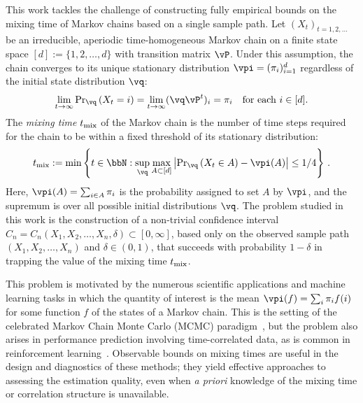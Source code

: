 

This work
tackles the challenge of constructing
fully empirical bounds on the
mixing time of Markov chains based on a single sample path.
Let $(X_t)_{t=1,2,\dotsc}$ be an irreducible, aperiodic
time-homogeneous Markov chain on a finite state space $[d] :=
\{1,2,\dotsc,d\}$ with transition matrix $\vP$.
Under this assumption, the chain converges to its unique stationary
distribution $\vpi =
(\pi_i)_{i=1}^d$ regardless of the initial state distribution $\vq$: 
\[
  \lim_{t\to\infty} {\Pr}_{\vq}\Parens{X_t = i}
  = \lim_{t\to\infty} (\vq \vP^t)_i = \pi_i
  \quad \text{for each $i \in [d]$} .
\]
The \emph{mixing time} $t_{\operatorname{mix}}$ of the Markov chain is the
number of time steps required
for the chain to
be within a fixed threshold of
its stationary
distribution:
\begin{align}
\label{eq:mixtimedef}
  \tmix
  :=
  \min\Braces{
    t \in \bbN :
    \sup_{\vq}
    \max_{A\subset [d]}
    \Abs{
      \textstyle\Pr_{\vq}\Parens{ X_t \in A } - \vpi(A)
    }
    \leq 1/4
  }\,.
\end{align}
Here, $\vpi(A) = \sum_{i\in A} \pi_i$ is the probability assigned to
set $A$ by $\vpi$, and the supremum is over all possible initial
distributions $\vq$.
The problem studied in this work is the construction of a non-trivial
confidence interval $C_n = C_n(X_1,X_2,\dotsc,X_n,\delta) \subset
[0,\infty]$, based only on the observed sample path
$(X_1,X_2,\dotsc,X_n)$ and $\delta \in (0,1)$, that
succeeds with probability $1-\delta$
in trapping
the value of the
mixing time $t_{\operatorname{mix}}$.

This problem is motivated by the numerous scientific applications and
machine learning tasks in which
the quantity of interest is
the
mean $\vpi(f) = \sum_i \pi_i f(i)$
for some function $f$ of the states of
a Markov chain.
  
This is the setting of the celebrated Markov Chain Monte Carlo (MCMC)
paradigm~\cite{liu2001monte}, but the problem also arises in
performance prediction involving time-correlated data, as is common in
reinforcement learning~\cite{sutton98}.
Observable bounds on mixing times are useful in the design and
diagnostics of these methods; they yield effective approaches to
assessing the estimation quality, even when \emph{a priori} knowledge
of the mixing time or correlation structure is unavailable.

